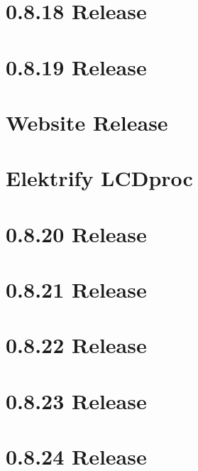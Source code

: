 \let\mypdfximage\pdfximage\def\pdfximage{\immediate\mypdfximage}\documentclass[twoside]{book}
\newcommand{\+}{\discretionary{\mbox{\scriptsize$\hookleftarrow$}}{}{}}
\begin{document}
\chapter{0.8.18 Release}
\label{doc_news_2016-09-17_0_8_18_md}

\chapter{0.8.19 Release}
\label{doc_news_2016-11-22_0_8_19_md}

\chapter{Website Release}
\label{doc_news_2016-12-17_website_release_md}

\chapter{Elektrify LCDproc}
\label{doc_news_2017-03-18_lcdproc_md}

\chapter{0.8.20 Release}
\label{doc_news_2017-10-31_0_8_20_md}

\chapter{0.8.21 Release}
\label{doc_news_2017-12-22_0_8_21_md}

\chapter{0.8.22 Release}
\label{doc_news_2018-03-27_0_8_22_md}

\chapter{0.8.23 Release}
\label{doc_news_2018-05-13_0_8_23_md}

\chapter{0.8.24 Release}
\label{doc_news_2018-08-18_0_8_24_md}

\end{document}
